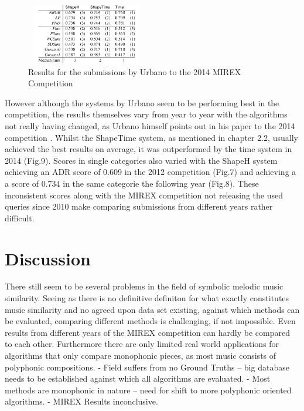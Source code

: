 \documentclass{llncs}
\begin{document}
        \begin{figure}[h!]
			\centering
            \includegraphics[width=200px,height=100px,keepaspectratio]{urbano_mirex_2014_results}
			\caption{Results for the submissions by Urbano to the 2014 MIREX Competition \cite{five_point_two}}
        \end{figure}
        
        However although the systems by Urbano seem to be performing best in the competition, the results themselves vary from year to year with the algorithms not really having changed, as Urbano himself points out in his paper to the 2014 competition \cite{five_point_five}.  Whilst the ShapeTime system, as mentioned in chapter 2.2, usually achieved the best results on average, it was outperformed by the time system in 2014 (Fig.9). Scores in single categories also varied with the ShapeH system achieving an ADR score of 0.609 in the 2012 competition (Fig.7) and achieving a a score of 0.734 in the same categorie the following year (Fig.8). These inconsistent scores along with the MIREX competition not releasing the used queries since 2010 make comparing submissions from different years rather difficult.




	\section{Discussion}

	There still seem to be  several problems in the field of symbolic melodic music similarity.
	Seeing as there is no definitive definiton for what exactly constitutes music similarity and no agreed upon data set existing, against which methods can be evaluated,  comparing different methods is challenging, if not impossible. Even results from different years of the MIREX competition can hardly be compared to each other. Furthermore there are only limited real world applications for algorithms that only compare monophonic pieces, as most music consists of polyphonic compositions. 
	- Field suffers from no Ground Truths -- big database needs to be established against which all algorithms are evaluated. 
	- Most methods are monophonic in nature -- need for shift to more polyphonic oriented algorithms.
	- MIREX Results inconclusive. 
	
\end{document}

